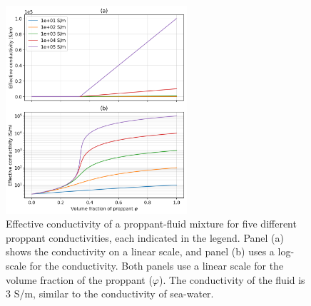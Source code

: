 \begin{figure}
    \begin{center}
    \includegraphics[width=0.6\textwidth]{figures/phys_prop_model/emt_spherical_particles.png}
    \end{center}
\caption{
    Effective conductivity of a proppant-fluid mixture for five different proppant
    conductivities, each indicated in the legend. Panel (a) shows the conductivity on a linear
    scale, and panel (b) uses a log-scale for the conductivity. Both panels use a linear scale for the
    volume fraction of the proppant ($\varphi$).
    The conductivity of the fluid is 3 S/m, similar to the conductivity of sea-water.
}
\label{fig:emt_spherical_particles}
\end{figure}
